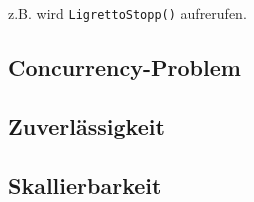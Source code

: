 z.B. wird {\tt LigrettoStopp()} aufrerufen.








\subsection{Concurrency-Problem}


\subsection{Zuverlässigkeit}



\subsection{Skallierbarkeit}


